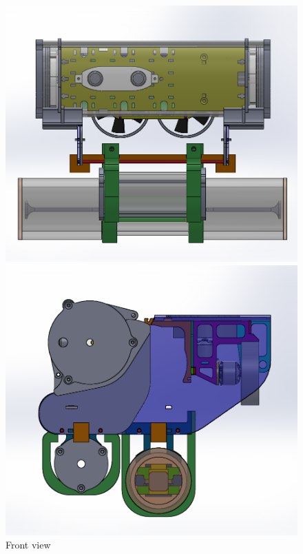\documentclass {udthesis}
\begin{document}
\begin{figure}	\label{fig:cooprov_cad}
    \centering
    \begin{minipage}{.33\textwidth}
        \centering
        \includegraphics[width=0.95\linewidth]{cooprov_frontview}
        \caption{Front view}
        \label{fig:cooprov_frontview}
    \end{minipage}%
    \begin{minipage}{0.33\textwidth}
        \centering
        \includegraphics[width=0.95\linewidth]{cooprov_sideview}

\end{minipage}
\end{figure}
\end{document}
